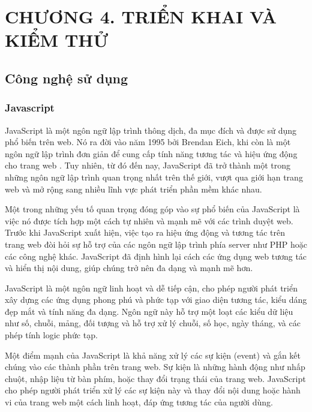 
\section*{CHƯƠNG 4. TRIỂN KHAI VÀ KIỂM THỬ}
\setcounter{section}{4}
\setcounter{subsection}{0} %
\setcounter{table}{0} %
\setcounter{figure}{0} %

\subsection{Công nghệ sử dụng}
\subsubsection{Javascript}
\mbox{}

JavaScript là một ngôn ngữ lập trình thông dịch, đa mục đích và được sử dụng phổ biến trên web. Nó ra đời vào năm 1995 bởi Brendan Eich, khi còn là một ngôn ngữ lập trình đơn giản để cung cấp tính năng tương tác và hiệu ứng động cho trang web \cite{js_1}. Tuy nhiên, từ đó đến nay, JavaScript đã trở thành một trong những ngôn ngữ lập trình quan trọng nhất trên thế giới, vượt qua giới hạn trang web và mở rộng sang nhiều lĩnh vực phát triển phần mềm khác nhau.

Một trong những yếu tố quan trọng đóng góp vào sự phổ biến của JavaScript là việc nó được tích hợp một cách tự nhiên và mạnh mẽ với các trình duyệt web. Trước khi JavaScript xuất hiện, việc tạo ra hiệu ứng động và tương tác trên trang web đòi hỏi sự hỗ trợ của các ngôn ngữ lập trình phía server như PHP hoặc các công nghệ khác. JavaScript đã định hình lại cách các ứng dụng web tương tác và hiển thị nội dung, giúp chúng trở nên đa dạng và mạnh mẽ hơn.

JavaScript là một ngôn ngữ linh hoạt và dễ tiếp cận, cho phép người phát triển xây dựng các ứng dụng phong phú và phức tạp với giao diện tương tác, kiểu dáng đẹp mắt và tính năng đa dạng. Ngôn ngữ này hỗ trợ một loạt các kiểu dữ liệu như số, chuỗi, mảng, đối tượng và hỗ trợ xử lý chuỗi, số học, ngày tháng, và các phép tính logic phức tạp.

Một điểm mạnh của JavaScript là khả năng xử lý các sự kiện (event) và gắn kết chúng vào các thành phần trên trang web. Sự kiện là những hành động như nhấp chuột, nhập liệu từ bàn phím, hoặc thay đổi trạng thái của trang web. JavaScript cho phép người phát triển xử lý các sự kiện này và thay đổi nội dung hoặc hành vi của trang web một cách linh hoạt, đáp ứng tương tác của người dùng.

